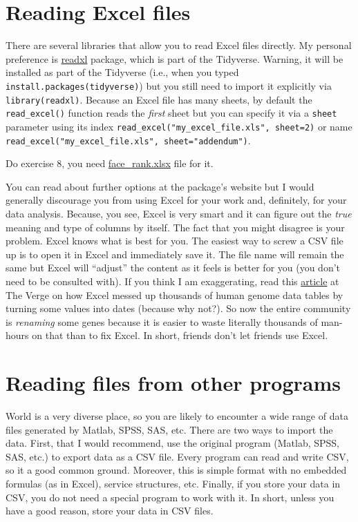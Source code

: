\documentclass[
]{book}
\begin{document}
\hypertarget{readxl}{%
\section{Reading Excel files}\label{readxl}}

There are several libraries that allow you to read Excel files directly. My personal preference is \href{https://readxl.tidyverse.org/}{readxl} package, which is part of the Tidyverse. Warning, it will be installed as part of the Tidyverse (i.e., when you typed \texttt{install.packages(tidyverse)}) but you still need to import it explicitly via \texttt{library(readxl)}. Because an Excel file has many sheets, by default the \texttt{read\_excel()} function reads the \emph{first} sheet but you can specify it via a \texttt{sheet} parameter using its index \texttt{read\_excel("my\_excel\_file.xls",\ sheet=2)} or name \texttt{read\_excel("my\_excel\_file.xls",\ sheet="addendum")}.

Do exercise 8, you need \href{data/face_rank.xlsx}{face\_rank.xlsx} file for it.

You can read about further options at the package's website but I would generally discourage you from using Excel for your work and, definitely, for your data analysis. Because, you see, Excel is very smart and it can figure out the \emph{true} meaning and type of columns by itself. The fact that you might disagree is your problem. Excel knows what is best for you. The easiest way to screw a CSV file up is to open it in Excel and immediately save it. The file name will remain the same but Excel will ``adjust'' the content as it feels is better for you (you don't need to be consulted with). If you think I am exaggerating, read this \href{https://www.theverge.com/2020/8/6/21355674/human-genes-rename-microsoft-excel-misreading-dates}{article} at The Verge on how Excel messed up thousands of human genome data tables by turning some values into dates (because why not?). So now the entire community is \emph{renaming} some genes because it is easier to waste literally thousands of man-hours on that than to fix Excel. In short, friends don't let friends use Excel.

\hypertarget{reading-files-from-other-programs}{%
\section{Reading files from other programs}\label{reading-files-from-other-programs}}

World is a very diverse place, so you are likely to encounter a wide range of data files generated by Matlab, SPSS, SAS, etc. There are two ways to import the data. First, that I would recommend, use the original program (Matlab, SPSS, SAS, etc.) to export data as a CSV file. Every program can read and write CSV, so it a good common ground. Moreover, this is simple format with no embedded formulas (as in Excel), service structures, etc. Finally, if you store your data in CSV, you do not need a special program to work with it. In short, unless you have a good reason, store your data in CSV files.
\end{document}
